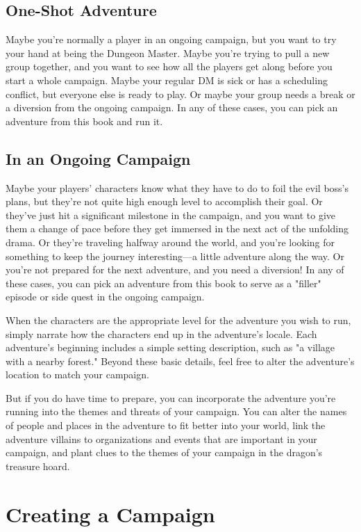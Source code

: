 \documentclass[letterpaper, 11pt, twocolumn]{dndbook}
\begin{document}
\subsection{One-Shot Adventure}

Maybe you're normally a player in an ongoing campaign, but you want to try your hand at being the Dungeon Master. Maybe you're trying to pull a new group together, and you want to see how all the players get along before you start a whole campaign. Maybe your regular DM is sick or has a scheduling conflict, but everyone else is ready to play. Or maybe your group needs a break or a diversion from the ongoing campaign. In any of these cases, you can pick an adventure from this book and run it.

\subsection{In an Ongoing Campaign}

Maybe your players' characters know what they have to do to foil the evil boss's plans, but they're not quite high enough level to accomplish their goal. Or they've just hit a significant milestone in the campaign, and you want to give them a change of pace before they get immersed in the next act of the unfolding drama. Or they're traveling halfway around the world, and you're looking for something to keep the journey interesting---a little adventure along the way. Or you're not prepared for the next adventure, and you need a diversion! In any of these cases, you can pick an adventure from this book to serve as a "filler" episode or side quest in the ongoing campaign.


When the characters are the appropriate level for the adventure you wish to run, simply narrate how the characters end up in the adventure's locale. Each adventure's beginning includes a simple setting description, such as "a village with a nearby forest." Beyond these basic details, feel free to alter the adventure's location to match your campaign.

But if you do have time to prepare, you can incorporate the adventure you're running into the themes and threats of your campaign. You can alter the names of people and places in the adventure to fit better into your world, link the adventure villains to organizations and events that are important in your campaign, and plant clues to the themes of your campaign in the dragon's treasure hoard.
\section{Creating a Campaign}
\end{document}
